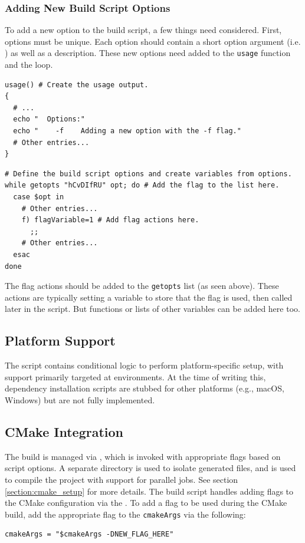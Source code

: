 \subsubsection{Adding New Build Script Options}

To add a new option to the build script, a few things need considered. First, options must be unique. Each option should contain a short option argument (i.e. ) as well as a description. These new options need added to the \texttt{usage} function and the  loop.
\begin{lstlisting}[style=shellstyle]
usage() # Create the usage output.
{
  # ...
  echo "  Options:"
  echo "    -f    Adding a new option with the -f flag."
  # Other entries...
}
\end{lstlisting}
\begin{lstlisting}[style=shellstyle]
# Define the build script options and create variables from options.
while getopts "hCvDIfRU" opt; do # Add the flag to the list here.
  case $opt in
    # Other entries...
    f) flagVariable=1 # Add flag actions here.
      ;;
    # Other entries...
  esac
done
\end{lstlisting}
The flag actions should be added to the \texttt{getopts} list (as seen above). These actions are typically setting a variable to store that the flag is used, then called later in the script. But functions or lists of other variables can be added here too.

\subsection{Platform Support}

The script contains conditional logic to perform platform-specific setup, with support primarily targeted at  environments. At the time of writing this, dependency installation scripts are stubbed for other platforms (e.g., macOS, Windows) but are not fully implemented.

\subsection{CMake Integration}

The build is managed via , which is invoked with appropriate flags based on script options. A separate  directory is used to isolate generated files, and  is used to compile the project with support for parallel jobs. See section \ref{section:cmake_setup} for more details. The build script handles adding flags to the CMake configuration via the . To add a flag to be used during the CMake build, add the appropriate flag to the \texttt{cmakeArgs} via the following:
\begin{lstlisting}[style=shellstyle]
cmakeArgs = "$cmakeArgs -DNEW_FLAG_HERE"
\end{lstlisting}

